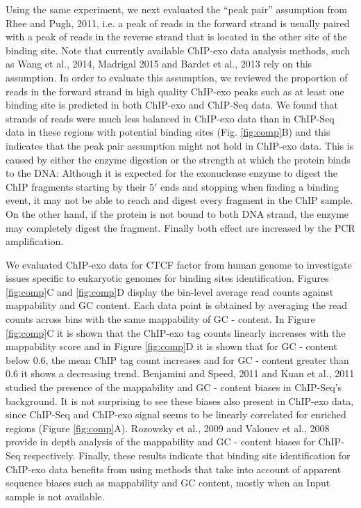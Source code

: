 \documentclass{bmcart}\usepackage[]{graphicx}\usepackage[]{color}
\begin{document}
Using the same experiment, we next evaluated the ``peak pair''
assumption from Rhee and Pugh, 2011\nocite{exo1}, i.e. a peak of reads
in the forward strand is usually paired with a peak of reads in the
reverse strand that is located in the other site of the binding
site. Note that currently available ChIP-exo data analysis methods,
such as Wang et al., 2014\nocite{mace}, Madrigal 2015\nocite{cexor}
and Bardet et al., 2013\nocite{peakzilla} rely on this assumption. In
order to evaluate this assumption, we reviewed the proportion of reads
in the forward strand in high quality ChIP-exo peaks such as at least
one binding site is predicted in both ChIP-exo and ChIP-Seq data. We
found that strands of reads were much less balanced in ChIP-exo data
than in ChIP-Seq data in these regions with potential binding sites
(Fig. \ref{fig:comp}B) and this indicates that the peak pair
assumption might not hold in ChIP-exo data. This is caused by either
the enzyme digestion or the strength at which the protein binds to the
DNA: Although it is expected for the exonuclease enzyme to digest the
ChIP fragments starting by their $5\prime$ ends and stopping when
finding a binding event, it may not be able to reach and digest every
fragment in the ChIP sample. On the other hand, if the protein is not
bound to both DNA strand, the enzyme may completely digest the
fragment. Finally both effect are increased by the PCR amplification.

We evaluated ChIP-exo data for CTCF factor from human genome
\cite{exo1} to investigate issues specific to eukaryotic genomes for
binding sites identification. Figures \ref{fig:comp}C and
\ref{fig:comp}D display the bin-level average read counts against
mappability and GC content. Each data point is obtained by averaging
the read counts across bins with the same mappability of GC -
content. In Figure \ref{fig:comp}C it is shown that the ChIP-exo tag
counts linearly increases with the mappability score and in Figure
\ref{fig:comp}D it is shown that for GC - content below 0.6, the mean
ChIP tag count increases and for GC - content greater than 0.6 it
shows a decreasing trend. Benjamini and Speed,
2011\nocite{benjamini2011} and Kuan et al., 2011\nocite{mosaics}
studied the presence of the mappability and GC - content biases in
ChIP-Seq's background. It is not surprising to see these biases also
present in ChIP-exo data, since ChIP-Seq and ChIP-exo signal seems to
be linearly correlated for enriched regions (Figure
\ref{fig:comp}A). Rozowsky et al., 2009\nocite{peakseq} and Valouev et
al., 2008\nocite{quest} provide in depth analysis of the mappability
and GC - content biases for ChIP-Seq respectively. Finally, these
results indicate that binding site identification for ChIP-exo data
benefits from using methods that take into account of apparent
sequence biases such as mappability and GC content, mostly when an
Input sample is not available.
\end{document}
